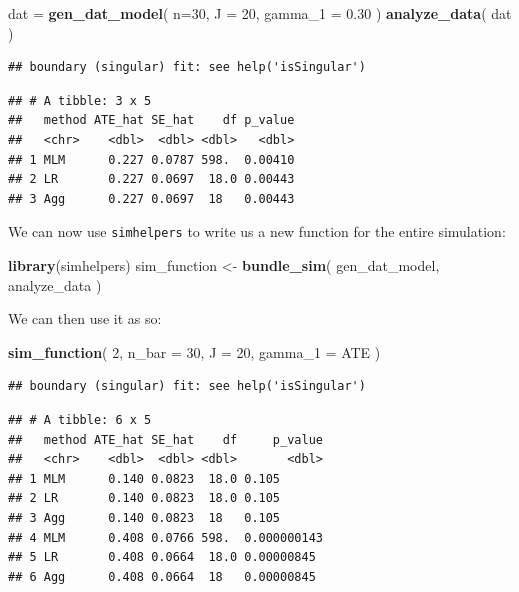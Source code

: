 \documentclass[
]{book}
\newenvironment{Shaded}{\begin{snugshade}}{\end{snugshade}}
\newcommand{\AttributeTok}[1]{\textcolor[rgb]{0.13,0.29,0.53}{#1}}
\newcommand{\DecValTok}[1]{\textcolor[rgb]{0.00,0.00,0.81}{#1}}
\newcommand{\FloatTok}[1]{\textcolor[rgb]{0.00,0.00,0.81}{#1}}
\newcommand{\FunctionTok}[1]{\textcolor[rgb]{0.13,0.29,0.53}{\textbf{#1}}}
\newcommand{\NormalTok}[1]{#1}
\newcommand{\OtherTok}[1]{\textcolor[rgb]{0.56,0.35,0.01}{#1}}
\begin{document}
\begin{Shaded}
\begin{Highlighting}[]
\NormalTok{dat }\OtherTok{=} \FunctionTok{gen\_dat\_model}\NormalTok{( }\AttributeTok{n=}\DecValTok{30}\NormalTok{, }\AttributeTok{J =} \DecValTok{20}\NormalTok{, }\AttributeTok{gamma\_1 =} \FloatTok{0.30}\NormalTok{ )}
\FunctionTok{analyze\_data}\NormalTok{( dat )}
\end{Highlighting}
\end{Shaded}

\begin{verbatim}
## boundary (singular) fit: see help('isSingular')
\end{verbatim}

\begin{verbatim}
## # A tibble: 3 x 5
##   method ATE_hat SE_hat    df p_value
##   <chr>    <dbl>  <dbl> <dbl>   <dbl>
## 1 MLM      0.227 0.0787 598.  0.00410
## 2 LR       0.227 0.0697  18.0 0.00443
## 3 Agg      0.227 0.0697  18   0.00443
\end{verbatim}

We can now use \texttt{simhelpers} to write us a new function for the entire simulation:

\begin{Shaded}
\begin{Highlighting}[]
\FunctionTok{library}\NormalTok{(simhelpers)}
\NormalTok{sim\_function }\OtherTok{\textless{}{-}} \FunctionTok{bundle\_sim}\NormalTok{( gen\_dat\_model, analyze\_data )}
\end{Highlighting}
\end{Shaded}

We can then use it as so:

\begin{Shaded}
\begin{Highlighting}[]
\FunctionTok{sim\_function}\NormalTok{( }\DecValTok{2}\NormalTok{, }\AttributeTok{n\_bar =} \DecValTok{30}\NormalTok{, }\AttributeTok{J =} \DecValTok{20}\NormalTok{, }\AttributeTok{gamma\_1 =}\NormalTok{ ATE )}
\end{Highlighting}
\end{Shaded}

\begin{verbatim}
## boundary (singular) fit: see help('isSingular')
\end{verbatim}

\begin{verbatim}
## # A tibble: 6 x 5
##   method ATE_hat SE_hat    df     p_value
##   <chr>    <dbl>  <dbl> <dbl>       <dbl>
## 1 MLM      0.140 0.0823  18.0 0.105      
## 2 LR       0.140 0.0823  18.0 0.105      
## 3 Agg      0.140 0.0823  18   0.105      
## 4 MLM      0.408 0.0766 598.  0.000000143
## 5 LR       0.408 0.0664  18.0 0.00000845 
## 6 Agg      0.408 0.0664  18   0.00000845
\end{verbatim}
\end{document}
